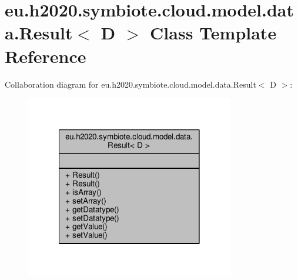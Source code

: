 \hypertarget{classeu_1_1h2020_1_1symbiote_1_1cloud_1_1model_1_1data_1_1Result}{}\section{eu.\+h2020.\+symbiote.\+cloud.\+model.\+data.\+Result$<$ D $>$ Class Template Reference}
\label{classeu_1_1h2020_1_1symbiote_1_1cloud_1_1model_1_1data_1_1Result}


Collaboration diagram for eu.\+h2020.\+symbiote.\+cloud.\+model.\+data.\+Result$<$ D $>$\+:
\nopagebreak
\begin{figure}[H]
\begin{center}
\leavevmode
\includegraphics[width=258pt]{classeu_1_1h2020_1_1symbiote_1_1cloud_1_1model_1_1data_1_1Result__coll__graph}
\end{center}
\end{figure}
